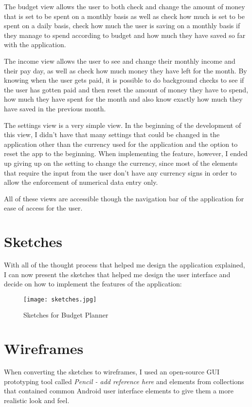 The budget view allows the user to both check and change the amount of money that is set to be spent on a monthly basis as well as check how much is set to be spent on a daily basis, check how much the user is saving on a monthly basis if they manage to spend according to budget and how much they have saved so far with the application.

The income view allows the user to see and change their monthly income and their pay day, as well as check how much money they have left for the month. By knowing when the user gets paid, it is possible to do background checks to see if the user has gotten paid and then reset the amount of money they have to spend, how much they have spent for the month and also know exactly how much they have saved in the previous month.

The settings view is a very simple view. In the beginning of the development of this view, I didn't have that many settings that could be changed in the application other than the currency used for the application and the option to reset the app to the beginning. When implementing the feature, however, I ended up giving up on the setting to change the currency, since most of the elements that require the input from the user don't have any currency signs in order to allow the enforcement of numerical data entry only.

All of these views are accessible though the navigation bar of the application for ease of access for the user.

\section{Sketches}
With all of the thought process that helped me design the application explained, I can now present the sketches that helped me design the user interface and decide on how to implement the features of the application:

\begin{figure}
  \caption{Sketches for Budget Planner}
  \centering
  \texttt{[image: sketches.jpg]}
\end{figure}

\section{Wireframes}
When converting the sketches to wireframes, I used an open-source GUI prototyping tool called \emph{Pencil - add reference here} and elements from collections that contained common Android user interface elements to give them a more realistic look and feel.

